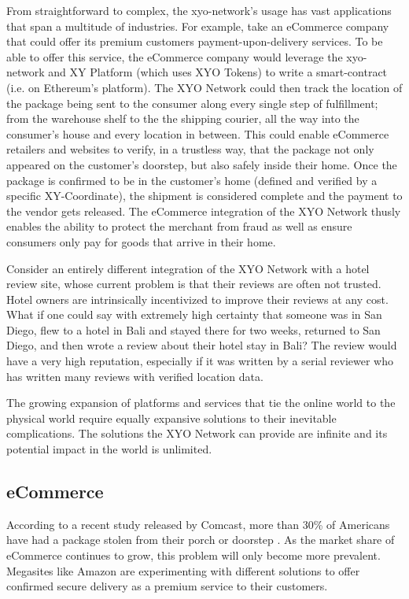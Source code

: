 \documentclass{article}
\begin{document}
From straightforward to complex, the \Gls{xyo-network}'s usage  has vast applications that span a multitude of industries. For example, take an eCommerce company that could offer its premium customers payment-upon-delivery services. To be able to offer this service, the eCommerce company would leverage the \Gls{xyo-network} and XY Platform (which uses XYO Tokens) to write a \gls{smart-contract} (i.e. on Ethereum's platform). The XYO Network could then track the location of the package being sent to the consumer along every single step of fulfillment; from the warehouse shelf to the the shipping courier, all the way into the consumer's house and every location in between. This could enable eCommerce retailers and websites to verify, in a \gls{trustless} way, that the package not only appeared on the customer's doorstep, but also safely inside their home. Once the package is confirmed to be in the customer's home (defined and verified by a specific XY-Coordinate), the shipment is considered complete and the payment to the vendor gets released. The eCommerce integration of the XYO Network thusly enables the ability to protect the merchant from fraud as well as ensure consumers only pay for goods that arrive in their home.

Consider an entirely different integration of the XYO Network with a hotel review site, whose current problem is that their reviews are often not trusted. Hotel owners are intrinsically incentivized to improve their reviews at any cost. What if one could say with extremely high \gls{certainty} that someone was in San Diego, flew to a hotel in Bali and stayed there for two weeks, returned to San Diego, and then wrote a review about their hotel stay in Bali? The review would have a very high reputation, especially if it was written by a serial reviewer who has written many reviews with verified location data.

The growing expansion of platforms and services that tie the online world to the physical world require equally expansive solutions to their inevitable complications. The solutions the XYO Network can provide are infinite and its potential impact in the world is unlimited.

\subsection{eCommerce}

According to a recent study released by Comcast, more than 30\% of Americans have had a package stolen from their porch or doorstep \cite{comcast-packagesurvey}. As the market share of eCommerce continues to grow, this problem will only become more prevalent. Megasites like Amazon are experimenting with different solutions to offer confirmed secure delivery as a premium service to their customers.
\end{document}
